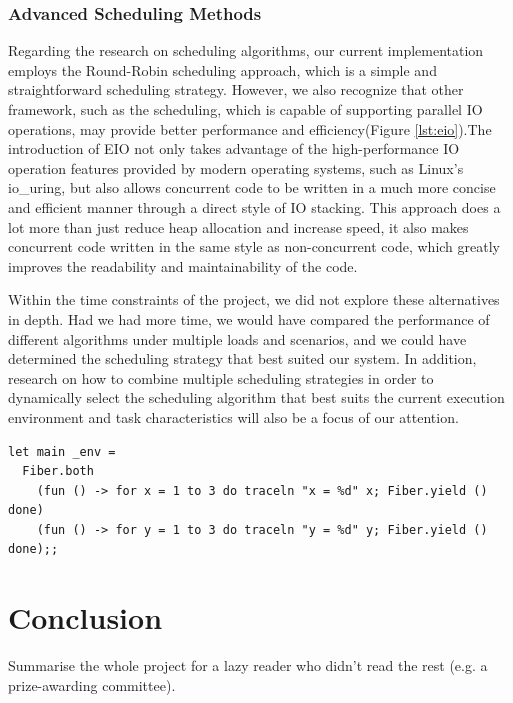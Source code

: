 \documentclass{l4proj}
\begin{document}
\subsection{Advanced Scheduling Methods}

Regarding the research on scheduling algorithms, our current implementation employs the Round-Robin scheduling approach, which is a simple and straightforward scheduling strategy. However, we also recognize that other framework, such as the \cite{_2024_ocamlmulticoreeio} scheduling, which is capable of supporting parallel IO operations, may provide better performance and efficiency(Figure \ref{lst:eio}).The introduction of EIO not only takes advantage of the high-performance IO operation features provided by modern operating systems, such as Linux's io\_uring, but also allows concurrent code to be written in a much more concise and efficient manner through a direct style of IO stacking. This approach does a lot more than just reduce heap allocation and increase speed, it also makes concurrent code written in the same style as non-concurrent code, which greatly improves the readability and maintainability of the code.

Within the time constraints of the project, we did not explore these alternatives in depth. Had we had more time, we would have compared the performance of different algorithms under multiple loads and scenarios, and we could have determined the scheduling strategy that best suited our system. In addition, research on how to combine multiple scheduling strategies in order to dynamically select the scheduling algorithm that best suits the current execution environment and task characteristics will also be a focus of our attention.

\noindent\begin{minipage}{\linewidth}
\lstset{style=ocamlstyle}
\begin{lstlisting}[caption={Example of running two threads of execution concurrently using Eio.Fiber}, label={lst:eio}]
let main _env =
  Fiber.both
    (fun () -> for x = 1 to 3 do traceln "x = %d" x; Fiber.yield () done)
    (fun () -> for y = 1 to 3 do traceln "y = %d" y; Fiber.yield () done);;
\end{lstlisting}
\end{minipage}


\chapter{Conclusion}    
Summarise the whole project for a lazy reader who didn't read the rest (e.g. a prize-awarding committee).
\end{document}
